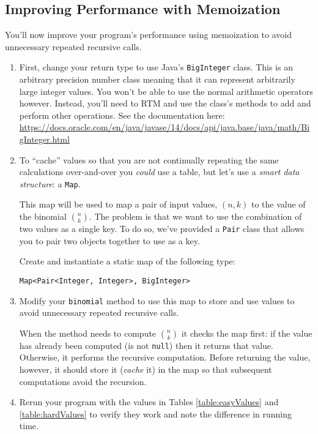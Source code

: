 \documentclass[12pt]{scrartcl}
\begin{document}
\subsection*{Improving Performance with Memoization}

You'll now improve your program's performance using memoization
to avoid unnecessary repeated recursive calls.  

\begin{enumerate}
  \item First, change your return type to use Java's \texttt{BigInteger}
  class.  This is an arbitrary precision number class meaning that it can 
  represent arbitrarily large integer values.  You won't be able to use 
  the normal arithmetic operators however.  Instead, you'll need to RTM and
  use the class's methods to add and perform other operations.  See the
  documentation here: \url{https://docs.oracle.com/en/java/javase/14/docs/api/java.base/java/math/BigInteger.html}
  \item To ``cache'' values so that you are not continually repeating the
  same calculations over-and-over you \emph{could} use a table, but let's 
  use a \emph{smart data structure}: a \texttt{Map}.
  
  This map will be used to map a pair of input values, $(n,k)$ to the
  value of the binomial ${n \choose k}$.  The problem is that we want
  to use the combination of two values as a single key.  To do so, we've
  provided a \texttt{Pair} class that allows you to pair two
  objects together to use as a key.
  
  Create and instantiate a static map of the following type:
  
  \texttt{Map<Pair<Integer, Integer>, BigInteger>} 
  
  \item Modify your \texttt{binomial} method to use this map
  to store and use values to avoid unnecessary repeated recursive calls.
  
  When the method needs to compute ${n \choose k}$ it checks the map
  first: if the value has already been computed (is not \texttt{null}) then it
  returns that value.  Otherwise, it performs the recursive computation.
  Before returning the value, however, it should store it (\emph{cache}
  it) in the map so that subsequent computations avoid the recursion.  
  
  \item Rerun your program with the values in Tables \ref{table:easyValues} 
  and \ref{table:hardValues} to verify they work and note the difference
  in running time.  
\end{enumerate}
\end{document}
